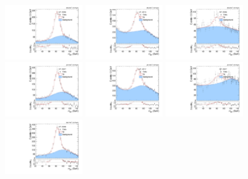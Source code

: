 \begin{figure}[htbp]
  \centering
  \includegraphics[width=0.3\textwidth]{fig/Vtag/PostFit__MJJ__allC_allL_HP_2016.pdf}
  \includegraphics[width=0.3\textwidth]{fig/Vtag/PostFit__MJJ__allC_allL_LP_2016.pdf}
  \includegraphics[width=0.3\textwidth]{fig/Vtag/PostFit__MJJ__allC_allL_NP_2016.pdf}\\
  \includegraphics[width=0.3\textwidth]{fig/Vtag/PostFit__MJJ__allC_allL_HP_2017.pdf}
  \includegraphics[width=0.3\textwidth]{fig/Vtag/PostFit__MJJ__allC_allL_LP_2017.pdf}
  \includegraphics[width=0.3\textwidth]{fig/Vtag/PostFit__MJJ__allC_allL_NP_2017.pdf}\\
  \includegraphics[width=0.3\textwidth]{fig/Vtag/PostFit__MJJ__allC_allL_HP_2018.pdf}

\end{figure}
